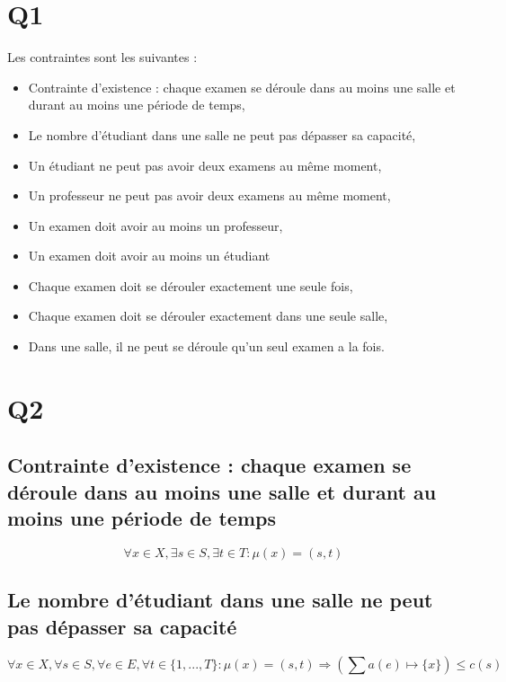 \documentclass[a4paper,11pt]{article}
\begin{document}
\section{Q1}
Les contraintes sont les suivantes :
\begin{itemize}
  \item Contrainte d'existence : chaque examen se déroule dans au moins une salle et durant au moins une période de temps,
  \item Le nombre d'étudiant dans une salle ne peut pas dépasser sa capacité,
  \item Un étudiant ne peut pas avoir deux examens au même moment,
  \item Un professeur ne peut pas avoir deux examens au même moment,
  \item Un examen doit avoir au moins un professeur,
  \item Un examen doit avoir au moins un étudiant
  \item Chaque examen doit se dérouler exactement une seule fois,
  \item Chaque examen doit se dérouler exactement dans une seule salle,
  \item Dans une salle, il ne peut se déroule qu'un seul examen a la fois.
\end{itemize}


\section{Q2}
\subsection{Contrainte d'existence : chaque examen se déroule dans au moins une salle et durant au moins une période de temps}
\begin{displaymath}
	\forall x \in X, \exists s \in S, \exists t \in T : \mu(x) = (s,t) 
\end{displaymath}

\subsection {Le nombre d'étudiant dans une salle ne peut pas dépasser sa capacité}
\begin{displaymath}
\forall x \in X , \forall s \in S ,\forall e \in E, \forall t \in \{1,...,T\} : \mu(x) = (s,t) \Rightarrow (\sum a(e) \mapsto \{x\}) \leq c(s)
\end{displaymath}	
\end{document}

